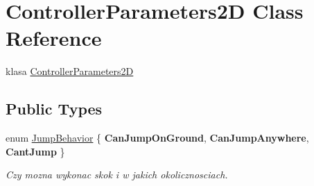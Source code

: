 \hypertarget{class_controller_parameters2_d}{}\section{Controller\+Parameters2\+D Class Reference}
\label{class_controller_parameters2_d}


klasa \hyperlink{class_controller_parameters2_d}{Controller\+Parameters2\+D}  


\subsection*{Public Types}
\begin{DoxyCompactItemize}
\item 
\hypertarget{class_controller_parameters2_d_a2838d319f4380bc1120750fdff3dd22f}{}enum \hyperlink{class_controller_parameters2_d_a2838d319f4380bc1120750fdff3dd22f}{Jump\+Behavior} \{ {\bfseries Can\+Jump\+On\+Ground}, 
{\bfseries Can\+Jump\+Anywhere}, 
{\bfseries Cant\+Jump}
 \}\label{class_controller_parameters2_d_a2838d319f4380bc1120750fdff3dd22f}
\begin{DoxyCompactList}\small\item\em Czy mozna wykonac skok i w jakich okolicznosciach. \end{DoxyCompactList}
\end{DoxyCompactItemize}
